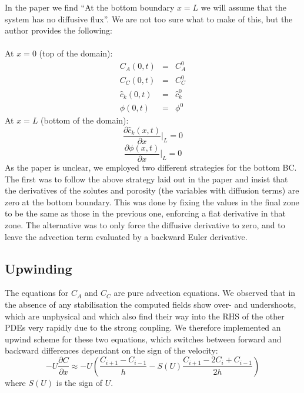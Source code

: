 \documentclass[a4paper]{article}
\begin{document}
In the paper we find ``At the bottom boundary $x=L$ we will assume that the system has no diffusive flux''.  We are not too sure what to make of this, but the author provides the following:\\\\
At $x=0$ (top of the domain):
\begin{eqnarray}
C_A(0,t)&=&C_{A}^0 \\
C_C(0,t)&=&C_{C}^0 \\
\hat{c}_k(0,t)&=&\hat{c}_{k}^0 \\
\phi(0,t) &=& \phi^0
\end{eqnarray}
At $x=L$ (bottom of the domain):
\[
\frac{\partial \hat{c}_k (x,t)}{\partial x}|_L = 0
\]
\[
\frac{\partial \phi (x,t)}{\partial x}|_L = 0
\]
As the paper is unclear, we employed two different strategies for the bottom BC.  The first was to follow the above strategy laid out in the paper and insist that the derivatives of the solutes and porosity (the variables with diffusion terms) are zero at the bottom boundary.  This was done by fixing the values in the final zone to be the same as those in the previous one, enforcing a flat derivative in that zone.  The alternative was to only force the diffusive derivative to zero, and to leave the advection term evaluated by a backward Euler derivative.  

\subsection*{Upwinding}
The equations for $C_A$ and $C_C$ are pure advection equations. We observed that in the absence of any stabilisation the computed fields show over- and undershoots, which are unphysical and which also find their way into the RHS of the other PDEs very rapidly due to the strong coupling. 
We therefore implemented an upwind scheme for these two equations, which switches between forward and backward differences dependant on the sign of the velocity:
\[
-U \frac{\partial C}{\partial x} \approx -U \left( \frac{C_{i+1} - C_{i-1}}{h} - S(U)\frac{C_{i+1} - 2C_{i} +C_{i-1}}{2h} \right)
\]
where $S(U)$ is the sign of $U$.  
\end{document}
